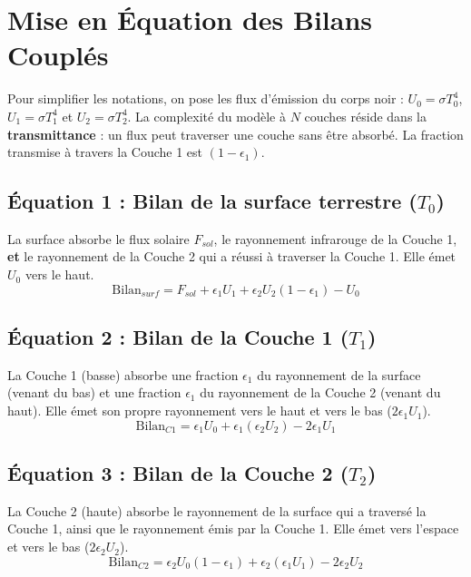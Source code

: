 \documentclass[11pt,a4paper]{article}
\begin{document}
\section{Mise en Équation des Bilans Couplés}
Pour simplifier les notations, on pose les flux d'émission du corps noir : $U_0 = \sigma T_0^4$, $U_1 = \sigma T_1^4$ et $U_2 = \sigma T_2^4$. La complexité du modèle à $N$ couches réside dans la \textbf{transmittance} : un flux peut traverser une couche sans être absorbé. La fraction transmise à travers la Couche 1 est $(1 - \epsilon_1)$.

\subsection{Équation 1 : Bilan de la surface terrestre ($T_0$)}
La surface absorbe le flux solaire $F_{sol}$, le rayonnement infrarouge de la Couche 1, \textbf{et} le rayonnement de la Couche 2 qui a réussi à traverser la Couche 1. Elle émet $U_0$ vers le haut.
\begin{equation}
    \text{Bilan}_{surf} = F_{sol} + \epsilon_1 U_1 + \epsilon_2 U_2 (1 - \epsilon_1) - U_0
\end{equation}

\subsection{Équation 2 : Bilan de la Couche 1 ($T_1$)}
La Couche 1 (basse) absorbe une fraction $\epsilon_1$ du rayonnement de la surface (venant du bas) et une fraction $\epsilon_1$ du rayonnement de la Couche 2 (venant du haut). Elle émet son propre rayonnement vers le haut et vers le bas ($2 \epsilon_1 U_1$).
\begin{equation}
    \text{Bilan}_{C1} = \epsilon_1 U_0 + \epsilon_1 (\epsilon_2 U_2) - 2 \epsilon_1 U_1
\end{equation}

\subsection{Équation 3 : Bilan de la Couche 2 ($T_2$)}
La Couche 2 (haute) absorbe le rayonnement de la surface qui a traversé la Couche 1, ainsi que le rayonnement émis par la Couche 1. Elle émet vers l'espace et vers le bas ($2 \epsilon_2 U_2$).
\begin{equation}
    \text{Bilan}_{C2} = \epsilon_2 U_0 (1 - \epsilon_1) + \epsilon_2 (\epsilon_1 U_1) - 2 \epsilon_2 U_2
\end{equation}
\end{document}

